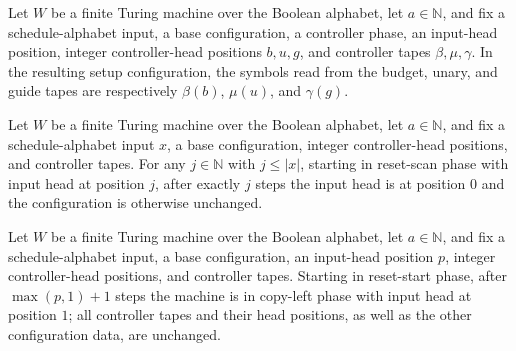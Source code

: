 \begin{lemma}
\label{Complexity.setupCfg_reads}
\leanok
{}
Let $W$ be a finite Turing machine over the Boolean alphabet, let $a\in\mathbb{N}$, and
fix a schedule-alphabet input, a base configuration, a controller phase, an input-head
position, integer controller-head positions $b,u,g$, and controller tapes
$\beta,\mu,\gamma$. In the resulting setup configuration, the symbols read from the
budget, unary, and guide tapes are respectively $\beta(b)$, $\mu(u)$, and $\gamma(g)$.
\end{lemma}

\begin{lemma}
\label{Complexity.setupCfg_reset_scan}
\leanok
{}
Let $W$ be a finite Turing machine over the Boolean alphabet, let $a\in\mathbb{N}$, and
fix a schedule-alphabet input $x$, a base configuration, integer controller-head
positions, and controller tapes. For any $j\in\mathbb{N}$ with $j\le |x|$, starting in
reset-scan phase with input head at position $j$, after exactly $j$ steps the input head
is at position $0$ and the configuration is otherwise unchanged.
\end{lemma}

\begin{lemma}
\label{Complexity.setupCfg_reset}
\leanok
{}
Let $W$ be a finite Turing machine over the Boolean alphabet, let $a\in\mathbb{N}$, and
fix a schedule-alphabet input, a base configuration, an input-head position $p$, integer
controller-head positions, and controller tapes. Starting in reset-start phase, after
$\max(p,1)+1$ steps the machine is in copy-left phase with input head at position $1$;
all controller tapes and their head positions, as well as the other configuration data,
are unchanged.
\end{lemma}

